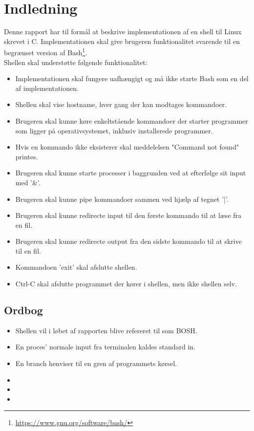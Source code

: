 \section{Indledning}
Denne rapport har til formål at beskrive implementationen af en shell til Linux skrevet i C. Implementationen skal give brugeren funktionalitet svarende til en begrænset version af Bash\footnote{\url{https://www.gnu.org/software/bash/}}. \\

Shellen skal understøtte følgende funktionalitet:
\begin{itemize}
	\item Implementationen skal fungere uafhængigt og må ikke starte Bash som en del af implementationen.
	\item Shellen skal vise hostname, hver gang der kan modtages kommandoer.
	\item Brugeren skal kunne køre enkeltstående kommandoer der starter programmer som ligger på operativsystemet, inklusiv installerede programmer.
	\item Hvis en kommando ikke eksisterer skal meddelelsen "Command not found" printes.
	\item Brugeren skal kunne starte processer i baggrunden ved at efterfølge sit input med '\&'.
	\item Brugeren skal kunne pipe kommandoer sammen ved hjælp af tegnet '|'.
	\item Brugeren skal kunne redirecte input til den første kommando til at læse fra en fil.
	\item Brugeren skal kunne redirecte output fra den sidste kommando til at skrive til en fil.
	\item Kommandoen 'exit' skal afslutte shellen.
	\item Ctrl-C skal afslutte programmet der kører i shellen, men ikke shellen selv.
\end{itemize}

\subsection{Ordbog}
\begin{itemize}
	\item Shellen vil i løbet af rapporten blive refereret til som BOSH.
	\item En proces' normale input fra terminalen kaldes standard in.
	\item En branch henviser til en gren af programmets kørsel.
	\item {}
	\item {}
	\item {}
\end{itemize}


